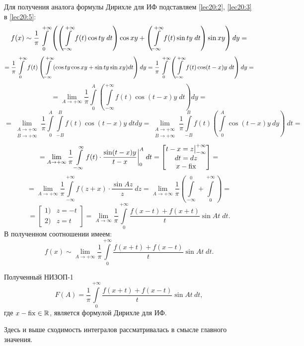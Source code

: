 \documentclass[../../main.tex]{subfiles}
\begin{document}
Для получения аналога формулы Дирихле для ИФ подставляем
\eqref{lec20:2}, \eqref{lec20:3} в \eqref{lec20:5}:
\[
f(x) \sim \dfrac{1}{\pi} \int\limits_{0}^{+\infty}
\left(
\left(\int\limits_{-\infty}^{+\infty} f(t) \cos ty\;dt\right) \cos xy +
\left(
\int\limits_{-\infty}^{+\infty} f(t) \sin ty\;dt
\right) \sin xy 
\right) dy = \] \[ =
\dfrac{1}{\pi}
\int\limits_{0}^{+\infty} f(t) \left(
\int\limits_{-\infty}^{+\infty} (\cos ty\cos xy + \sin ty\sin xy) dt
\right) dy =
\dfrac{1}{\pi} \int\limits_{0}^{+\infty} \left(
\int\limits_{-\infty}^{+\infty} f(t) \cos(t - x)y\;dt
\right) dy = \] \[ =
\lim\limits_{A \to +\infty} \dfrac{1}{\pi}
\int\limits_0^{A} \left(
\int\limits_{-\infty}^{+\infty}
f(t) \cos(t - x)y\;dt
\right) dy =
\] \[ = 
\lim\limits_{\substack{A \to +\infty \\ B \to +\infty}} \dfrac{1}{\pi}
\int\limits_0^A \int\limits_{-B}^B f(t) \cos(t-x)y\;dtdy =
\lim\limits_{\substack{A \to +\infty \\ B \to +\infty}}
\dfrac{1}{\pi} \int\limits_{-B}^B f(t) \left(
\int\limits_0^A
 \cos (t - x) y\ dy \right)\ dt =
\] \[ = 
\lim\limits_{A \to +\infty} \dfrac{1}{\pi}
\int\limits_{-\infty}^{\infty} f(t) \cdot
\dfrac{\sin (t - x)y}{t - x}\bigg|_0^A\;dt = 
\begin{bmatrix}
t - x = z \big|_{-\infty}^{+\infty}\\
dt = dz \\
x - \operatorname{fix}
\end{bmatrix} =
\] \[ = 
\lim\limits_{A \to +\infty} \dfrac{1}{\pi} 
\int\limits_{-\infty}^{+\infty} f(z + x)\cdot
\dfrac{\sin Az}{z}\ dz =
\lim\limits_{A \to +\infty} \dfrac{1}{\pi}
\left(
\int\limits_{-\infty}^{0} + 
\int\limits_{0}^{+\infty}
\right) =
\] \[ = 
\begin{bmatrix}
1)& z = -t \\
2)& z = t
\end{bmatrix} =
\lim\limits_{A \to \infty} \dfrac{1}{\pi}
\int\limits_{0}^{+\infty}
\dfrac{f(x - t) + f(x + t)}{t} \sin At\;dt.
\]
В полученном соотношении имеем:
\begin{equation}
\label{lec20:6}
	f(x) \sim \lim\limits_{A \to +\infty} \dfrac{1}{\pi} 
	\int\limits_0^{+\infty} \dfrac{f(x + t) + f(x - t)}{t} \sin At\;dt.
\end{equation}

Полученный НИЗОП-1
\begin{equation}
\label{lec20:7}
	F(A) = \dfrac{1}{\pi} \int\limits_0^{+\infty} 
	\dfrac{f(x + t) + f(x - t)}{t} \sin At\ dt,
\end{equation}
где $ x - \operatorname{fix} \in \mathbb{R} $, является формулой Дирихле для ИФ.

\begin{erem}
Здесь и выше сходимость интегралов рассматривалась в 
смысле главного значения.
\end{erem}
\end{document}
